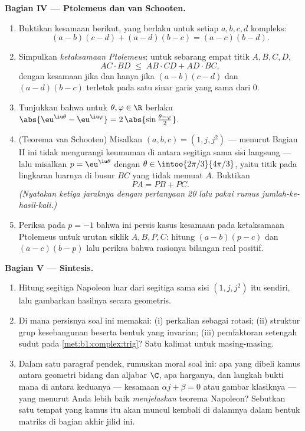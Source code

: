\begin{problem}
\medskip
\noindent\textbf{Bagian IV --- Ptolemeus dan van Schooten.}
\begin{enumerate}[resume]
  \item Buktikan kesamaan berikut, yang berlaku untuk setiap $a, b, c, d$ kompleks:
        \[
        (a - b)(c - d) + (a - d)(b - c) = (a - c)(b - d) .
        \]
  \item Simpulkan \emph{ketaksamaan Ptolemeus}: untuk sebarang empat titik $A, B, C, D$,
        \[
        AC \cdot BD \;\leq\; AB \cdot CD + AD \cdot BC ,
        \]
        dengan kesamaan jika dan hanya jika $(a-b)(c-d)$ dan
        $(a-d)(b-c)$ terletak pada satu sinar garis yang sama dari $0$.
  \item Tunjukkan bahwa untuk $\theta, \varphi \in \R$ berlaku
        $\abs{\eu^{\iu\theta} - \eu^{\iu\varphi}} =
        2\,\abs{\sin\frac{\theta - \varphi}2}$.
  \item (Teorema van Schooten) Misalkan
        $(a, b, c) = (1, j, j^2)$ --- menurut Bagian II ini tidak mengurangi
        keumuman di antara segitiga sama sisi langsung --- lalu misalkan
        $p = \eu^{\iu\theta}$ dengan $\theta \in
        \intoo{2\pi/3}{4\pi/3}$, yaitu titik pada lingkaran luarnya di
        busur $BC$ yang tidak memuat $A$. Buktikan
        \[
        PA = PB + PC .
        \]
        \emph{(Nyatakan ketiga jaraknya dengan pertanyaan 20 lalu pakai
        rumus jumlah-ke-hasil-kali.)}
  \item Periksa pada $p = -1$ bahwa ini persis kasus kesamaan
        pada ketaksamaan Ptolemeus untuk urutan siklik $A, B, P, C$:
        hitung $(a - b)(p - c)$ dan $(a - c)(b - p)$ lalu periksa
        bahwa rasionya bilangan real positif.
\end{enumerate}

\medskip
\noindent\textbf{Bagian V --- Sintesis.}
\begin{enumerate}[resume]
  \item Hitung segitiga Napoleon luar dari segitiga sama sisi
        $(1, j, j^2)$ itu sendiri, lalu gambarkan hasilnya
        secara geometris.
  \item Di mana persisnya soal ini memakai: (i) perkalian sebagai
        rotasi; (ii) struktur grup kesebangunan beserta
        bentuk yang invarian; (iii) pemfaktoran setengah sudut pada
        \cref{met:b1:complex:trig}? Satu kalimat untuk masing-masing.
  \item Dalam satu paragraf pendek, rumuskan moral soal ini:
        apa yang dibeli kamus antara geometri bidang dan
        aljabar $\C$, apa harganya, dan langkah bukti mana di antara
        keduanya --- kesamaan $\alpha j + \beta = 0$ atau
        gambar klasiknya --- yang menurut Anda lebih baik
        \emph{menjelaskan} teorema Napoleon? Sebutkan satu tempat yang
        kamus itu akan muncul kembali di dalamnya dalam bentuk matriks
        di bagian akhir jilid ini.

\end{enumerate}
\end{problem}

